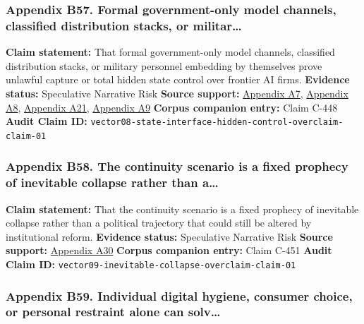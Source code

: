 \documentclass[
  american,
  11pt,
  letterpaper,
]{article}
\begin{document}
\subsubsection{Appendix B57. Formal government-only model channels,
classified distribution stacks, or
militar\ldots{}}\label{appendix-b57-formal-government-only-model-channels-classified-distribution-stacks-or-militar}

\textbf{Claim statement:} That formal government-only model channels,
classified distribution stacks, or military personnel embedding by
themselves prove unlawful capture or total hidden state control over
frontier AI firms. \textbf{Evidence status:} Speculative Narrative Risk
\textbf{Source support:}
\hyperref[appendix-a7-introducing-openai-for-government]{Appendix A7},
\hyperref[appendix-a8-claude-gov-models-for-u-s-national-security-customers]{Appendix
A8},
\hyperref[appendix-a21-anthropic-and-palantir-partner-to-bring-claude-ai-models-to-aws-for-u-s-government-intelligence-and-defense-operations]{Appendix
A21},
\hyperref[appendix-a9-army-launches-detachment-201-executive-innovation-corps-to-drive-tech-transformation]{Appendix
A9} \textbf{Corpus companion entry:} Claim C-448 \textbf{Audit Claim
ID:} \texttt{vector08-state-interface-hidden-control-overclaim-claim-01}

\subsubsection{Appendix B58. The continuity scenario is a fixed prophecy
of inevitable collapse rather than
a\ldots{}}\label{appendix-b58-the-continuity-scenario-is-a-fixed-prophecy-of-inevitable-collapse-rather-than-a}

\textbf{Claim statement:} That the continuity scenario is a fixed
prophecy of inevitable collapse rather than a political trajectory that
could still be altered by institutional reform. \textbf{Evidence
status:} Speculative Narrative Risk \textbf{Source support:}
\hyperref[appendix-a30-encyclical-letter-of-his-holiness-leo-xiv-magnifica-humanitas]{Appendix
A30} \textbf{Corpus companion entry:} Claim C-451 \textbf{Audit Claim
ID:} \texttt{vector09-inevitable-collapse-overclaim-claim-01}

\subsubsection{Appendix B59. Individual digital hygiene, consumer
choice, or personal restraint alone can
solv\ldots{}}\label{appendix-b59-individual-digital-hygiene-consumer-choice-or-personal-restraint-alone-can-solv}
\end{document}
